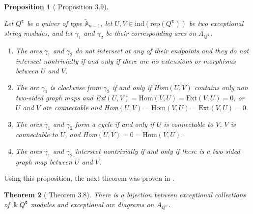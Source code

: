 \documentclass[12pt]{amsart}
\theoremstyle{plain}
\newtheorem{thm}{Theorem}[section]
\newtheorem{prop}[thm]{Proposition}
\theoremstyle{definition}
\theoremstyle{remark}
\begin{document}
\begin{prop}[\cite{maresca2022combinatorics} Proposition 3.9] \label{prop: clockwise arcs and hom}

Let $Q^{\bm{\varepsilon}}$ be a quiver of type $\tilde{\mathbb{A}}_{n-1}$, let $U,V \in \text{ind}(\text{rep}(Q^{\bm{\varepsilon}}))$ be two exceptional string modules, and let $\gamma_1$ and $\gamma_2$ be their corresponding arcs on $A_{Q^{\bm\varepsilon}}$.
\begin{enumerate}

\item The arcs $\gamma_1$ and $\gamma_2$ do not intersect at any of their endpoints and they do not intersect nontrivially if and only if there are no extensions or morphisms between $U$ and $V$.

\item The arc $\gamma_1$ is clockwise from $\gamma_2$ if and only if Hom$(U,V)$ contains only non two-sided graph maps and Ext$(U,V) = \text{Hom}(V,U) = \text{Ext}(V,U) = 0$, or $U$ and $V$ are connectable and Hom$(U,V) =\text{Hom}(V,U) = \text{Ext}(V,U) = 0$.

\item The arcs $\gamma_1$ and $\gamma_2$ form a cycle if and only if $U$ is connectable to $V$, $V$ is connectable to $U$, and Hom$(U,V) = 0 = \text{Hom}(V,U)$. 

\item The arcs $\gamma_1$ and $\gamma_2$ intersect nontrivially if and only if there is a two-sided graph map between $U$ and $V$.

\end{enumerate}
\end{prop}

Using this proposition, the next theorem was proven in \cite{maresca2022combinatorics}.

\begin{thm}[\cite{maresca2022combinatorics} Theorem 3.8]\label{thm: ec bijection with arc diagrams}
There is a bijection between exceptional collections of $\Bbbk Q^{\bm{\varepsilon}}$ modules and exceptional arc diagrams on $A_{Q^{\bm{\varepsilon}}}$.
\end{thm}
\end{document}
